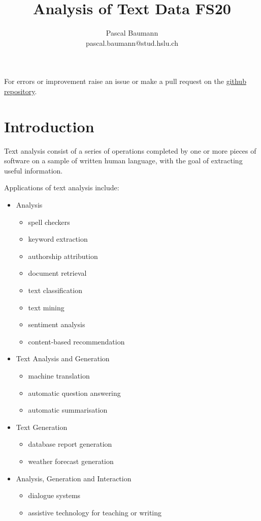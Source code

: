 \documentclass[11pt]{article}
\begin{document}
	
\title{Analysis of Text Data FS20}
\author{Pascal Baumann\\pascal.baumann@stud.hslu.ch}
\maketitle



For errors or improvement raise an issue or make a pull request on the \href{https://github.com/KilnOfTheSecondFlame/mse_summaries}{github repository}.

\tableofcontents
\newpage

\section{Introduction}
Text analysis consist of a series of operations completed by one or more pieces of software on a sample of written human language, with the goal of extracting useful information.

Applications of text analysis include:
\begin{itemize}[noitemsep]
	\item Analysis
	\begin{itemize}
		\item spell checkers
		\item keyword extraction
		\item authorship attribution
		\item document retrieval
		\item text classification
		\item text mining
		\item sentiment analysis
		\item content-based recommendation
	\end{itemize}
	\item Text Analysis and Generation
	\begin{itemize}
		\item machine translation
		\item automatic question answering
		\item automatic summarisation
	\end{itemize}
	\item Text Generation
	\begin{itemize}
		\item database report generation
		\item weather forecast generation
	\end{itemize}
	\item Analysis, Generation and Interaction
	\begin{itemize}
		\item dialogue systems
		\item assistive technology for teaching or writing
	\end{itemize}
\end{itemize}
\end{document}
